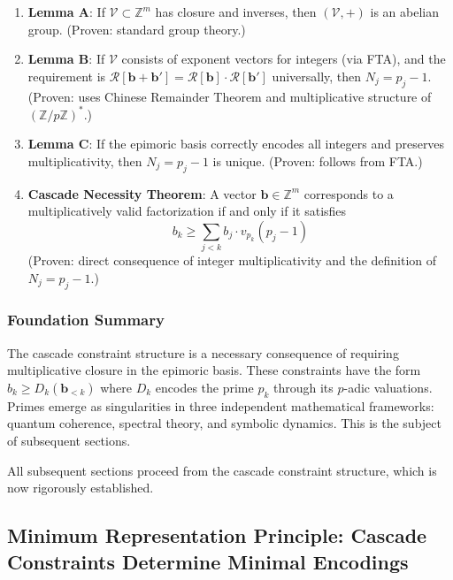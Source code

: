 \begin{enumerate}

\item \textbf{Lemma A}: If $\mathcal{V} \subset \mathbb{Z}^m$ has closure and inverses, then $(\mathcal{V}, +)$ is an abelian group. (Proven: standard group theory.)

\item \textbf{Lemma B}: If $\mathcal{V}$ consists of exponent vectors for integers (via FTA), and the requirement is $\mathcal{R}[\mathbf{b} + \mathbf{b}'] = \mathcal{R}[\mathbf{b}] \cdot \mathcal{R}[\mathbf{b}']$ universally, then $N_j = p_j - 1$. (Proven: uses Chinese Remainder Theorem and multiplicative structure of $(\mathbb{Z}/p\mathbb{Z})^*$.)

\item \textbf{Lemma C}: If the epimoric basis correctly encodes all integers and preserves multiplicativity, then $N_j = p_j - 1$ is unique. (Proven: follows from FTA.)

\item \textbf{Cascade Necessity Theorem}: A vector $\mathbf{b} \in \mathbb{Z}^m$ corresponds to a multiplicatively valid factorization if and only if it satisfies
\begin{equation}
b_k \geq \sum_{j<k} b_j \cdot v_{p_k}(p_j - 1)
\end{equation}
(Proven: direct consequence of integer multiplicativity and the definition of $N_j = p_j - 1$.)

\end{enumerate}

\subsubsection{Foundation Summary}
\label{subsubsec:foundation-summary}

The cascade constraint structure is a necessary consequence of requiring multiplicative closure in the epimoric basis. These constraints have the form $b_k \geq D_k(\mathbf{b}_{<k})$ where $D_k$ encodes the prime $p_k$ through its $p$-adic valuations. Primes emerge as singularities in three independent mathematical frameworks: quantum coherence, spectral theory, and symbolic dynamics. This is the subject of subsequent sections.

\noindent All subsequent sections proceed from the cascade constraint structure, which is now rigorously established.

\subsection{Minimum Representation Principle: Cascade Constraints Determine Minimal Encodings}
\label{subsec:minimum-representation}

